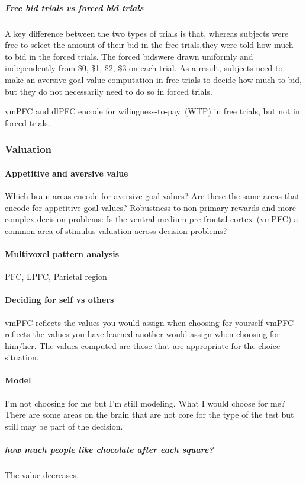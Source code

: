 \documentclass[12pt,article,oneside,a4paper]{memoir}
\begin{document}
\subparagraph{Free bid trials vs forced bid trials}
A key difference between the two types of trials is that, whereas subjects were
free to select the amount of their bid in the free trials,they were told how
much to bid in the forced trials. The forced bidswere drawn uniformly and
independently from \$0, \$1, \$2, \$3 on each trial. As a result, subjects need
to make an aversive goal value computation in free trials to decide how much to
bid, but they do not necessarily need to do so in forced trials.

vmPFC and dlPFC encode for wilingness-to-pay~(WTP) in free trials, but not in
forced trials.

\subsubsection{Valuation}
\paragraph{Appetitive and aversive value}
Which brain areas encode for aversive goal values?
Are these the same areas that encode for appetitive goal values?
Robustness to non-primary rewards and more complex decision problems: Is the
ventral medium pre frontal cortex~(vmPFC) a common area of stimulus valuation
across decision problems?

\paragraph{Multivoxel pattern analysis} PFC, LPFC, Parietal region
\paragraph{Deciding for self vs others}
vmPFC reflects the values you would assign when choosing for yourself
vmPFC reflects the values you have learned another would assign when choosing
for him/her. The values computed are those that are appropriate for the choice
situation.

\paragraph{Model}
I'm not choosing for me but I'm still modeling. What I would choose for me?
There are some areas on the brain that are not core for the type of the test but
still may be part of the decision.
\subparagraph{how much people like chocolate after each square?} The value decreases.
\end{document}

